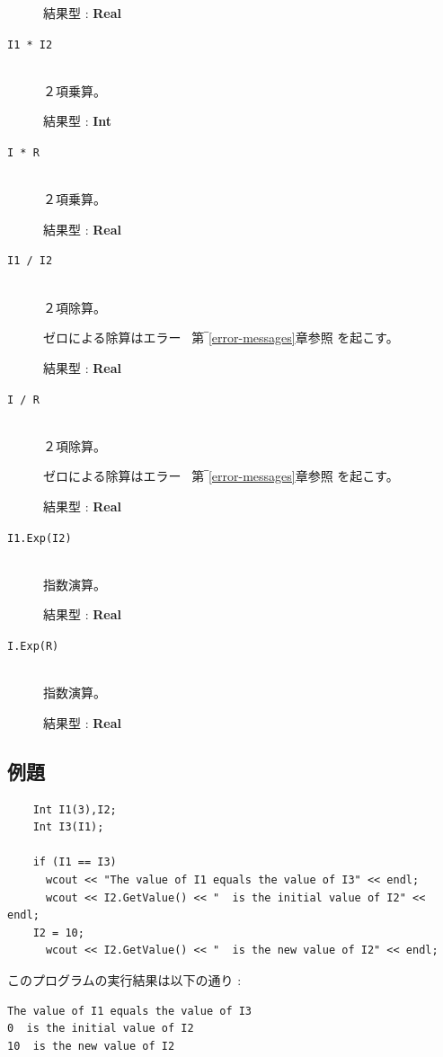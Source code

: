 \documentclass[\pformat,12pt]{jarticle}
\begin{document}
\begin{description}
     結果型 : {\bf Real}

\item[{\tt I1 * I2}] \mbox{}\\
     ２項乗算。 

     結果型 : {\bf Int}

\item[{\tt I * R}] \mbox{}\\
     ２項乗算。 

     結果型 : {\bf Real}

\item[{\tt I1 / I2}] \mbox{}\\
     ２項除算。 

     ゼロによる除算はエラー \ 第‾\ref{error-messages}章参照 を起こす。

     結果型 : {\bf Real}

\item[{\tt I / R}] \mbox{}\\
     ２項除算。 

     ゼロによる除算はエラー \ 第‾\ref{error-messages}章参照 を起こす。

     結果型 : {\bf Real}

\item[{\tt I1.Exp(I2)}] \mbox{}\\
     指数演算。

     結果型 : {\bf Real}

\item[{\tt I.Exp(R)}] \mbox{}\\
     指数演算。

     結果型 : {\bf Real}

\end{description}

\subsection*{例題}

\begin{verbatim}
    Int I1(3),I2;
    Int I3(I1);

    if (I1 == I3)
      wcout << "The value of I1 equals the value of I3" << endl;
      wcout << I2.GetValue() << "  is the initial value of I2" << endl;
    I2 = 10;
      wcout << I2.GetValue() << "  is the new value of I2" << endl;
\end{verbatim}

\noindent このプログラムの実行結果は以下の通り :

\begin{verbatim}
The value of I1 equals the value of I3
0  is the initial value of I2
10  is the new value of I2
\end{verbatim}
\end{document}
